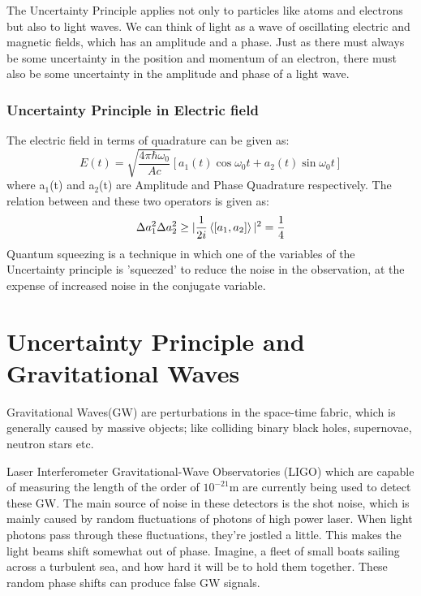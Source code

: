 \documentclass[conference]{IEEEtran}
\begin{document}
The Uncertainty Principle applies not only to particles like atoms and electrons but also to light waves. We can think of light as a wave of oscillating electric and magnetic fields, which has an amplitude and a phase. Just as there must always be some uncertainty in the position and momentum of an electron, there must also be some uncertainty in the amplitude and phase of a light wave.

\subsubsection*{Uncertainty Principle in Electric field}
The electric field in terms of quadrature can be given as\cite{phdthesis_eric}:
\begin{equation}
E(t)=\sqrt{\frac{4\pi \hbar \omega_0}{Ac}}[a_1(t)\cos{\omega_0 t}+a_2(t)\sin{\omega_0 t}]    
\end{equation}
where a$_1$(t) and a$_2$(t) are Amplitude and Phase Quadrature respectively. The relation between and these two operators is given as:
\begin{equation}
\Delta a_{1}^2 \Delta a_{2}^2 \geq |\frac{1}{2i}\braket{[a_1,a_2]}|^2=\frac{1}{4}    
\end{equation}
Quantum squeezing is a technique in which one of the variables of the Uncertainty principle is 'squeezed' to reduce the noise in the observation, at the expense of increased noise in the conjugate variable.

\section{Uncertainty Principle and Gravitational Waves}

Gravitational Waves(GW) are perturbations in the space-time fabric, which is generally caused by massive objects; like colliding binary black holes, supernovae, neutron stars etc.

Laser Interferometer Gravitational-Wave Observatories (LIGO) which are capable of measuring the length of the order of $10^{-21}$m  are currently being used to detect these GW. The main source of noise in these detectors is the shot noise, which is mainly caused by random fluctuations of photons of high power laser\cite{Chu}. When light photons pass through these fluctuations, they're jostled a little. This makes the light beams shift somewhat out of phase. Imagine, a fleet of small boats sailing across a turbulent sea, and how hard it will be to hold them together. These random phase shifts can produce false GW signals. 
\end{document}

